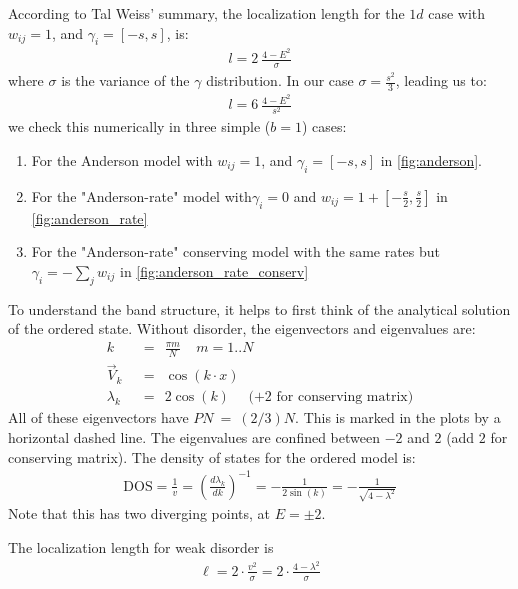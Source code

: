 \documentclass[onecolumn,fleqn,longbibliography]{revtex4}
\begin{document}
According to Tal Weiss' summary, the localization length
for the $1d$ case with $w_{ij}=1$, and $\gamma_i = [-s,s]$, is:
\begin{align}
 l = 2 \ \frac{4 - E^2}{\sigma} 
 \end{align}
where $\sigma$ is the variance of the $\gamma$ distribution. 
In our case $\sigma = \frac{s^2}{3}$, leading us to:
\begin{align}\label{eq:anderson_l}
 l = 6 \ \frac{4-E^2}{s^2} 
 \end{align}
we check this numerically in three simple ($b=1$) cases:
\begin{enumerate}
    \item{For the Anderson model with $w_{ij}=1$, and $\gamma_i = [-s,s]$ in \autoref{fig:anderson}.}
    \item{For the "Anderson-rate" model with$\gamma_i=0$ and $w_{ij}= 1 + \left[-\frac{s}{2}, \frac{s}{2} \right]$
            in \autoref{fig:anderson_rate}}
    \item{For the "Anderson-rate" conserving model with the same rates but $\gamma_i = -\sum_j w_{ij}$
            in \autoref{fig:anderson_rate_conserv}}
\end{enumerate}

To understand the band structure, it helps to first think of the analytical 
solution of the ordered state.
Without disorder, the eigenvectors and eigenvalues are:
\begin{align}
k\ \  &=\ \  \frac{\pi m}{N} \ \ \ \ \ m=1..N \\
\vec{V}_k\ \  &=\ \  \cos(k\cdot x)\\
\lambda_k\ \  &=\ \  2\cos(k) \ \ \ \ \ \ (+2 \textrm{  for conserving matrix)} 
\end{align}
All of these eigenvectors have $PN\ =\ (2/3)N$.
This is marked in the plots by a horizontal dashed line. 
The eigenvalues are confined between $-2$ and $2$  (add $2$ for conserving matrix).
The density of states for the ordered model is:
%
\begin{align}
\textrm{DOS} = \frac{1}{v} = \left(\frac{d\lambda_k}{dk}\right)^{-1} = -\frac{1}{2\sin(k)} = -\frac{1}{\sqrt{4-\lambda^2}}
\end{align}
Note that this has two diverging points, at $E=\pm 2$.


The localization length for weak disorder is 
\begin{align}
\ell = 2\cdot\frac{v^2}{\sigma}= 2\cdot\frac{4-\lambda^2}{\sigma}
\end{align}
\end{document}
